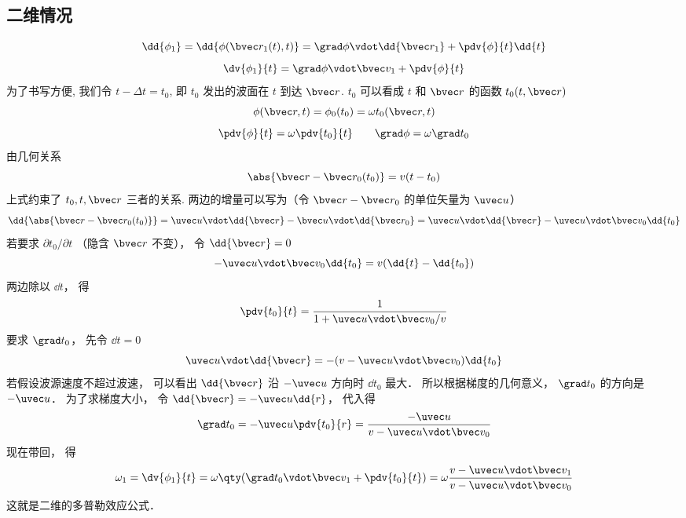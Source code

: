 \subsection{二维情况}
\begin{equation}
\dd{\phi_1} = \dd{\phi(\bvec r_1(t), t)} = \grad \phi \vdot \dd{\bvec r_1} + \pdv{\phi}{t}\dd{t}
\end{equation}
\begin{equation}
\dv{\phi_1}{t} = \grad\phi \vdot \bvec v_1 + \pdv{\phi}{t}
\end{equation}
为了书写方便, 我们令 $t - \Delta t = t_0$, 即 $t_0$ 发出的波面在 $t$ 到达 $\bvec r$. $t_0$ 可以看成 $t$ 和 $\bvec r$ 的函数  $t_0(t, \bvec r)$
\begin{equation}
\phi(\bvec r, t) =  \phi_0(t_0) = \omega t_0(\bvec r, t)
\end{equation}
\begin{equation}
\pdv{\phi}{t} = \omega \pdv{t_0}{t} \qquad
\grad \phi = \omega \grad t_0
\end{equation}
由几何关系
\begin{equation}
\abs{\bvec r - \bvec r_0(t_0)} = v(t - t_0)
\end{equation}
上式约束了 $t_0, t, \bvec r$ 三者的关系. 两边的增量可以写为（令 $\bvec r - \bvec r_0$ 的单位矢量为 $\uvec u$）
\begin{equation}
\dd{\abs{\bvec r - \bvec r_0(t_0)}} = \uvec u \vdot \dd{\bvec r} - \bvec u \vdot \dd{\bvec r_0} = \uvec u \vdot \dd{\bvec r} - \uvec u \vdot \bvec v_0 \dd{t_0}
\end{equation}
若要求 $\partial t_0 / \partial t$ （隐含 $\bvec r$ 不变）， 令 $\dd{\bvec r} = 0$
\begin{equation}
-\uvec u \vdot \bvec v_0 \dd{t_0} = v(\dd{t} - \dd{t_0})
\end{equation}
两边除以 $\dd{t}$， 得
\begin{equation}
\pdv{t_0}{t} = \frac{1}{1 + \uvec u \vdot \bvec v_0/v}
\end{equation}
要求 $\grad t_0$， 先令 $\dd{t} = 0$
\begin{equation}
\uvec u \vdot \dd{\bvec r} = -(v - \uvec u \vdot \bvec v_0) \dd{t_0}
\end{equation}
若假设波源速度不超过波速， 可以看出 $\dd{\bvec r}$ 沿 $-\uvec u$ 方向时 $\dd{t_0}$ 最大． 所以根据梯度的几何意义， $\grad t_0$ 的方向是 $-\uvec u$． 为了求梯度大小， 令 $\dd{\bvec r} = -\uvec u \dd{r}$， 代入得
\begin{equation}
\grad t_0 = -\uvec u \pdv{t_0}{r} = \frac{ - \uvec u}{v - \uvec u \vdot \bvec v_0}
\end{equation}
现在带回， 得
\begin{equation}
\omega_1 = \dv{\phi_1}{t} = \omega\qty(\grad t_0 \vdot \bvec v_1 + \pdv{t_0}{t}) = \omega \frac{v - \uvec u \vdot \bvec v_1}{v - \uvec u \vdot \bvec v_0}
\end{equation}
这就是二维的多普勒效应公式．
